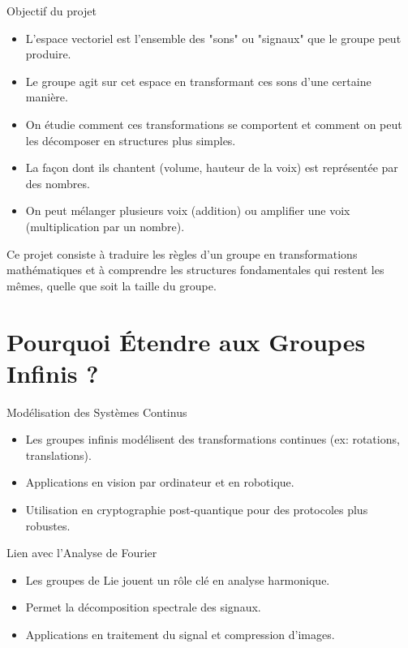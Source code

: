 \documentclass[french]{beamer}
\begin{document}
	\begin{frame}{Objectif du projet}
			\begin{itemize}
			\item  L’espace vectoriel est l’ensemble des "sons" ou "signaux" que le groupe peut produire.
			\item Le groupe agit sur cet espace en transformant ces sons d’une certaine manière.
			\item  On étudie comment ces transformations se comportent et comment on peut les décomposer en structures plus simples.
			\item La façon dont ils chantent (volume, hauteur de la voix) est représentée par des nombres.
			\item On peut mélanger plusieurs voix (addition) ou amplifier une voix (multiplication par un nombre).
		\end{itemize}
		Ce projet consiste à traduire les règles d’un groupe en transformations mathématiques et à comprendre les structures fondamentales qui restent les mêmes, quelle que soit la taille du groupe.
	\end{frame}
	

	
	\section{Pourquoi Étendre aux Groupes Infinis ?}
	\begin{frame}{Modélisation des Systèmes Continus}
		\begin{itemize}
			\item Les groupes infinis modélisent des transformations continues (ex: rotations, translations).
			\item Applications en vision par ordinateur et en robotique.
			\item Utilisation en cryptographie post-quantique pour des protocoles plus robustes.
		\end{itemize}
	\end{frame}
	
	\begin{frame}{Lien avec l’Analyse de Fourier}
		\begin{itemize}
			\item Les groupes de Lie jouent un rôle clé en analyse harmonique.
			\item Permet la décomposition spectrale des signaux.
			\item Applications en traitement du signal et compression d’images.
		\end{itemize}
	\end{frame}
	
\end{document}
